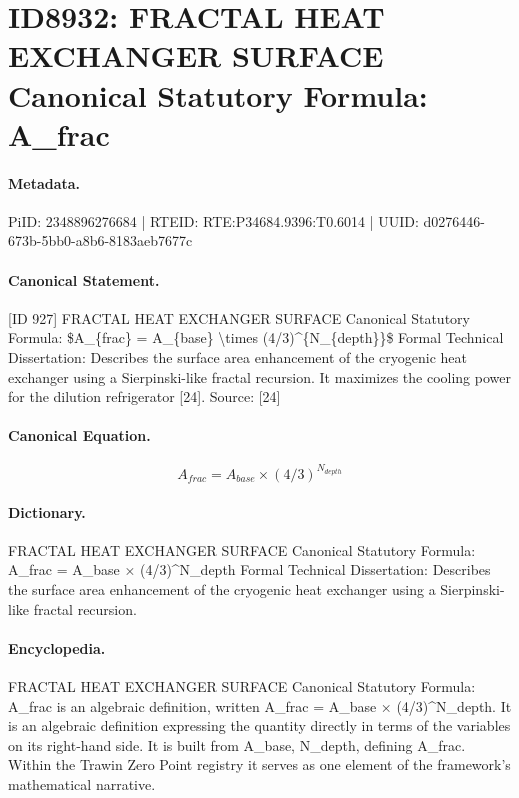 \section*{ID8932: FRACTAL HEAT EXCHANGER SURFACE Canonical Statutory Formula: A\_frac}
\paragraph{Metadata.}
PiID: 2348896276684 | RTEID: RTE:P34684.9396:T0.6014 | UUID: d0276446-673b-5bb0-a8b6-8183aeb7677c

\paragraph{Canonical Statement.}
[ID 927] FRACTAL HEAT EXCHANGER SURFACE Canonical Statutory Formula: \$A\_\{frac\} = A\_\{base\} \textbackslash{}times (4/3)\textasciicircum{}\{N\_\{depth\}\}\$ Formal Technical Dissertation: Describes the surface area enhancement of the cryogenic heat exchanger using a Sierpinski-like fractal recursion. It maximizes the cooling power for the dilution refrigerator [24]. Source: [24]

\paragraph{Canonical Equation.}
\[
A_{frac} = A_{base} \times (4/3)^{N_{depth}}
\]

\paragraph{Dictionary.}
FRACTAL HEAT EXCHANGER SURFACE Canonical Statutory Formula: A\_frac = A\_base × (4/3)\textasciicircum{}N\_depth Formal Technical Dissertation: Describes the surface area enhancement of the cryogenic heat exchanger using a Sierpinski-like fractal recursion.

\paragraph{Encyclopedia.}
FRACTAL HEAT EXCHANGER SURFACE Canonical Statutory Formula: A\_frac is an algebraic definition, written A\_frac = A\_base × (4/3)\textasciicircum{}N\_depth. It is an algebraic definition expressing the quantity directly in terms of the variables on its right-hand side. It is built from A\_base, N\_depth, defining A\_frac. Within the Trawin Zero Point registry it serves as one element of the framework's mathematical narrative.
